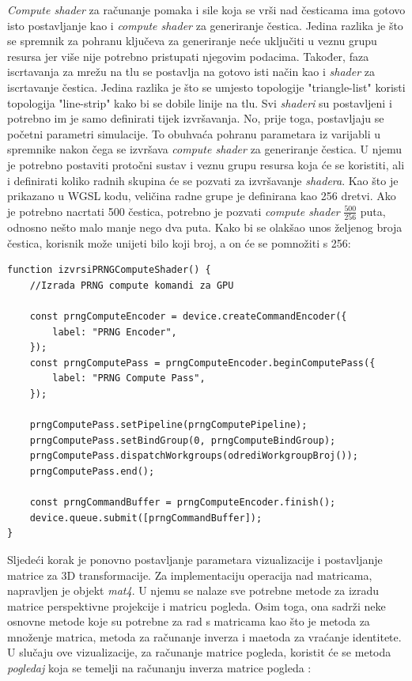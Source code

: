\documentclass{foi}
\begin{document}
\textit{Compute shader} za računanje pomaka i sile koja se vrši nad česticama ima gotovo isto postavljanje kao i \textit{compute shader} za generiranje čestica. Jedina razlika je što se spremnik za pohranu ključeva za generiranje neće uključiti u veznu grupu resursa jer više nije potrebno pristupati njegovim podacima. Također, faza iscrtavanja za mrežu na tlu se postavlja na gotovo isti način kao i \textit{shader} za iscrtavanje čestica. Jedina razlika je što se umjesto topologije "triangle-list" koristi topologija "line-strip" kako bi se dobile linije na tlu. Svi \textit{shaderi} su postavljeni i potrebno im je samo definirati tijek izvršavanja. No, prije toga, postavljaju se početni parametri simulacije. To obuhvaća pohranu parametara iz varijabli u spremnike nakon čega se izvršava \textit{compute shader} za generiranje čestica. U njemu je potrebno postaviti protočni sustav i veznu grupu resursa koja će se koristiti, ali i definirati koliko radnih skupina će se pozvati za izvršavanje \textit{shadera}. Kao što je prikazano u WGSL kodu, veličina radne grupe je definirana kao 256 dretvi. Ako je potrebno nacrtati 500 čestica, potrebno je pozvati \textit{compute shader} $\frac{500}{256}$ puta, odnosno nešto malo manje nego dva puta. Kako bi se olakšao unos željenog broja čestica, korisnik može unijeti bilo koji broj, a on će se pomnožiti s 256:
\begin{verbatim}
function izvrsiPRNGComputeShader() {
	//Izrada PRNG compute komandi za GPU
	
	const prngComputeEncoder = device.createCommandEncoder({
		label: "PRNG Encoder",
	});
	const prngComputePass = prngComputeEncoder.beginComputePass({
		label: "PRNG Compute Pass",
	});
	
	prngComputePass.setPipeline(prngComputePipeline);
	prngComputePass.setBindGroup(0, prngComputeBindGroup);
	prngComputePass.dispatchWorkgroups(odrediWorkgroupBroj());
	prngComputePass.end();
	
	const prngCommandBuffer = prngComputeEncoder.finish();
	device.queue.submit([prngCommandBuffer]);
}
\end{verbatim}

Sljedeći korak je ponovno postavljanje parametara vizualizacije i postavljanje matrice za 3D transformacije. Za implementaciju operacija nad matricama, napravljen je objekt \textit{mat4}. U njemu se nalaze sve potrebne metode za izradu matrice perspektivne projekcije i matricu pogleda. Osim toga, ona sadrži neke osnovne metode koje su potrebne za rad s matricama kao što je metoda za množenje matrica, metoda za računanje inverza i maetoda za vraćanje identitete. U slučaju ove vizualizacije, za računanje matrice pogleda, koristit će se metoda \textit{pogledaj} koja se temelji na računanju inverza matrice pogleda \parencite{WebGPUFundamentalsCameras}:
\end{document}
